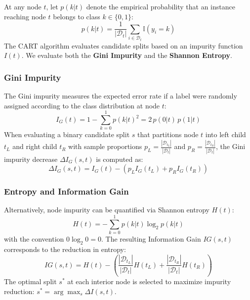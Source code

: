 \documentclass[pdflatex,sn-mathphys-num]{sn-jnl}
\begin{document}
At any node $t$, let $p(k|t)$ denote the empirical probability that an instance reaching node $t$ belongs to class $k \in \{0, 1\}$:
\begin{equation}
p(k|t) = \frac{1}{|\mathcal{D}_t|} \sum_{i \in \mathcal{D}_t} \mathbb{I}(y_i = k)
\end{equation}
The CART algorithm evaluates candidate splits based on an impurity function $I(t)$. We evaluate both the \textbf{Gini Impurity} and the \textbf{Shannon Entropy}.

\subsubsection{Gini Impurity}
The Gini impurity measures the expected error rate if a label were randomly assigned according to the class distribution at node $t$:
\begin{equation}
I_G(t) = 1 - \sum_{k=0}^1 p(k|t)^2 = 2 \, p(0|t) \, p(1|t)
\end{equation}
When evaluating a binary candidate split $s$ that partitions node $t$ into left child $t_L$ and right child $t_R$ with sample proportions $p_L = \frac{|\mathcal{D}_{t_L}|}{|\mathcal{D}_t|}$ and $p_R = \frac{|\mathcal{D}_{t_R}|}{|\mathcal{D}_t|}$, the Gini impurity decrease $\Delta I_G(s, t)$ is computed as:
\begin{equation}
\Delta I_G(s, t) = I_G(t) - \left( p_L I_G(t_L) + p_R I_G(t_R) \right)
\end{equation}

\subsubsection{Entropy and Information Gain}
Alternatively, node impurity can be quantified via Shannon entropy $H(t)$:
\begin{equation}
H(t) = - \sum_{k=0}^1 p(k|t) \log_2 p(k|t)
\end{equation}
with the convention $0 \log_2 0 = 0$. The resulting Information Gain $IG(s, t)$ corresponds to the reduction in entropy:
\begin{equation}
IG(s, t) = H(t) - \left( \frac{|\mathcal{D}_{t_L}|}{|\mathcal{D}_t|} H(t_L) + \frac{|\mathcal{D}_{t_R}|}{|\mathcal{D}_t|} H(t_R) \right)
\end{equation}
The optimal split $s^*$ at each interior node is selected to maximize impurity reduction: $s^* = \arg\max_s \Delta I(s, t)$.
\end{document}

